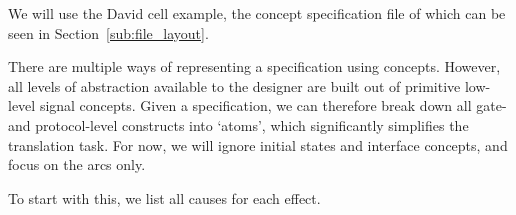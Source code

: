 \documentclass[british,conference,compsoc]{IEEEtran}
\begin{document}
We will use the David cell example, the concept specification file of which can 
be seen in Section~\ref{sub:file_layout}. 

There are multiple ways of representing a specification using concepts. However,
all levels of abstraction available to the designer are built out of primitive 
low-level signal concepts. Given a specification, we can therefore break down 
all gate- and protocol-level constructs into `atoms', which significantly 
simplifies the translation task. For now, we will ignore initial states and interface
concepts, and focus on the arcs only.

%
%
%

%

To start with this, we list all causes for each effect.

\vspace{-1mm}
\end{document}
